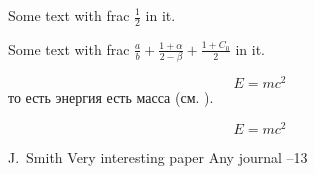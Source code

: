 \documentclass{article}
\begin{document}
Some text with frac $\frac{1}{2}$ in it.

Some text with frac $\frac{a}{b}+\frac{1+\alpha}{2-\beta}+\frac{1+C_0}{2}$ in it.  %



\begin{equation}\label{eq1}
E=mc^2
\end{equation}
то есть энергия есть масса (см. \cite{Einstein}).

$$E=mc^2$$

\begin{thebibliography}{99}


\by J.~Smith
\paper Very interesting paper
\jour Any journal
--13


\end{thebibliography}
\end{document}
